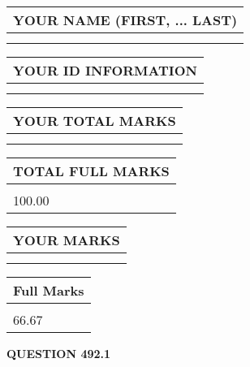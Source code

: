 \documentclass{ctexart}
\begin{document}
   
   
   
\newpage 
\setcounter{page}{ 
   492001 } 
   
   
   
   
\noindent\begin{tabular}{|l|}
\hline
YOUR NAME (FIRST, ... LAST)  \\
\hline
 \\ 
 \\ 
\hline
\end{tabular}
\hspace{0.05in} \begin{tabular}{|l|}
\hline
 YOUR   ID   INFORMATION  \\
\hline
 \\ 
 \\ 
\hline
\end{tabular}
   
   
\vspace{0.2in}\noindent\begin{tabular}{|l|}
\hline
YOUR TOTAL MARKS  \\
\hline
 \\ 
 \\ 
\hline
\end{tabular}
\hspace{0.05in} \begin{tabular}{|l|}
\hline
TOTAL FULL MARKS  \\
\hline
 \\ 
100.00 \\
\hline
\end{tabular}
   
   
 \vspace{0.2in}
 
 
 
 
   
   
  
\vspace{0.2in}
  
\noindent\begin{tabular}{|l|}
\hline
 YOUR MARKS  \\
\hline
 \\ 
 \\ 
\hline
\end{tabular}
\hspace{0.05in} \begin{tabular}{|l|}
\hline
 Full Marks  \\
\hline
 \\ 
66.67 \\
\hline
\end{tabular}
{\textbf{\Large{QUESTION
492.1 
}}}
  
\end{document}
